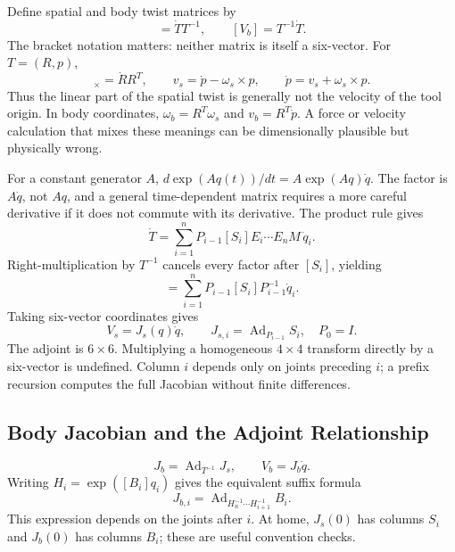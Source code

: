 Define spatial and body twist matrices by
\begin{equation}
 [V_s]=\dot T T^{-1},\qquad [V_b]=T^{-1}\dot T.
\end{equation}
The bracket notation matters: neither matrix is itself a six-vector. For $T=(R,p)$,
\begin{equation}
 [\omega_s]_\times=\dot R R^T,\qquad
 v_s=\dot p-\omega_s\times p,\qquad
 \dot p=v_s+\omega_s\times p.
\end{equation}
Thus the linear part of the spatial twist is generally not the velocity of the tool origin. In body coordinates, $\omega_b=R^T\omega_s$ and $v_b=R^T\dot p$. A force or velocity calculation that mixes these meanings can be dimensionally plausible but physically wrong.

For a constant generator $A$, $d\exp(Aq(t))/dt=A\exp(Aq)\dot q$. The factor is $A\dot q$, not $Aq$, and a general time-dependent matrix requires a more careful derivative if it does not commute with its derivative. The product rule gives
\begin{equation}
 \dot T=\sum_{i=1}^n P_{i-1}[S_i]E_i\cdots E_nM\,\dot q_i.
\end{equation}
Right-multiplication by $T^{-1}$ cancels every factor after $[S_i]$, yielding
\begin{equation}
 [V_s]=\sum_{i=1}^n P_{i-1}[S_i]P_{i-1}^{-1}\dot q_i.
\end{equation}
Taking six-vector coordinates gives
\begin{equation}
 \label{eq:spatial_jacobian}
 V_s=J_s(q)\dot q,\qquad
 J_{s,i}=\operatorname{Ad}_{P_{i-1}}S_i,\quad P_0=I.
\end{equation}
The adjoint is $6\times6$. Multiplying a homogeneous $4\times4$ transform directly by a six-vector is undefined. Column $i$ depends only on joints preceding $i$; a prefix recursion computes the full Jacobian without finite differences.

\subsection{Body Jacobian and the Adjoint Relationship}
\label{sec:body_jacobian}
\begin{equation}
 \label{eq:jacobian_adjoint}
 J_b=\operatorname{Ad}_{T^{-1}}J_s,\qquad V_b=J_b\dot q.
\end{equation}
Writing $H_i=\exp([B_i]q_i)$ gives the equivalent suffix formula
\begin{equation}
 J_{b,i}=\operatorname{Ad}_{H_n^{-1}\cdots H_{i+1}^{-1}}B_i.
\end{equation}
This expression depends on the joints after $i$. At home, $J_s(0)$ has columns $S_i$ and $J_b(0)$ has columns $B_i$; these are useful convention checks.

